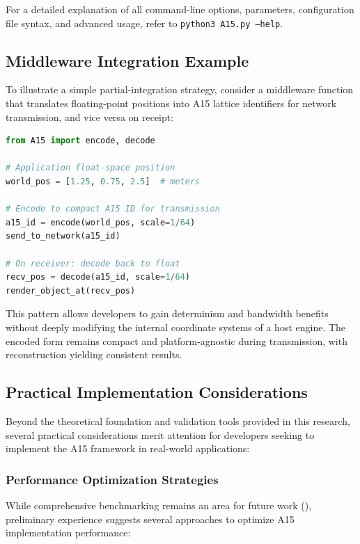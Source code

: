 \documentclass[10pt]{article}
\begin{document}
For a detailed explanation of all command-line options, parameters, configuration file syntax, and advanced usage, refer to \texttt{python3 A15.py --help}.

\subsection{Middleware Integration Example}\label{subsec-example-middleware}

To illustrate a simple partial-integration strategy, consider a middleware function that translates floating-point positions into A15 lattice identifiers for network transmission, and vice versa on receipt:

\begin{lstlisting}[language=Python, basicstyle=\footnotesize\ttfamily, frame=single, caption=Middleware-style round-trip conversion from float to A15 and back.]
from A15 import encode, decode

# Application float-space position
world_pos = [1.25, 0.75, 2.5]  # meters

# Encode to compact A15 ID for transmission
a15_id = encode(world_pos, scale=1/64)
send_to_network(a15_id)

# On receiver: decode back to float
recv_pos = decode(a15_id, scale=1/64)
render_object_at(recv_pos)
\end{lstlisting}

This pattern allows developers to gain determinism and bandwidth benefits without deeply modifying the internal coordinate systems of a host engine. The encoded form remains compact and platform-agnostic during transmission, with reconstruction yielding consistent results.

\subsection{Practical Implementation Considerations}\label{subsec-practical-implementation}

Beyond the theoretical foundation and validation tools provided in this research, several practical considerations merit attention for developers seeking to implement the A15 framework in real-world applications:

\subsubsection{Performance Optimization Strategies}\label{subsubsec-impl-performance}
While comprehensive benchmarking remains an area for future work (), preliminary experience suggests several approaches to optimize A15 implementation performance:
\end{document}
